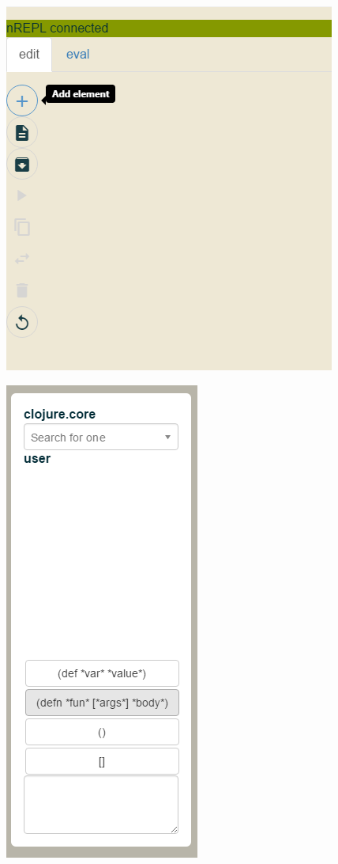 \documentclass[11pt]{scrartcl}
\begin{document}
\begin{figure}
  \centering
  \begin{minipage}{0.48\textwidth}
    \centering
    \includegraphics[scale=0.3]{img/j-add}
\label{fig:j-add}
  \end{minipage}
  \begin{minipage}{0.48\textwidth}
    \centering
    \includegraphics[scale=0.3]{img/j-add_box}
\label{fig:j-add_box}
  \end{minipage}
\end{figure}
\end{document}
